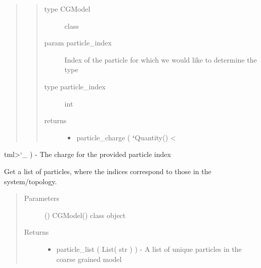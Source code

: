 \documentclass[letterpaper,12pt,english,openany,oneside]{sphinxmanual}
\begin{document}
\begin{fulllineitems}
\begin{fulllineitems}
\begin{quote}
\begin{quote}
\begin{description}
\item[{type CGModel}] \leavevmode
class

\item[{param particle\_index}] \leavevmode
Index of the particle for which we would like to determine the type

\item[{type particle\_index}] \leavevmode
int

\item[{returns}] \leavevmode\begin{itemize}
\item {} 
particle\_charge ( {\color{red}\bfseries{}{}`}Quantity() \textless{}

\end{itemize}

\end{description}\end{quote}
\end{quote}

tml\textgreater{}{}`\_ ) - The charge for the provided particle index

\end{fulllineitems}


\begin{fulllineitems}
\label{\detokenize{cg_model:cg_model.cgmodel.CGModel.get_particle_list}}
Get a list of particles, where the indices correspond to those in the system/topology.
\begin{quote}\begin{description}
\item[{Parameters}] \leavevmode
{} () \textendash{} CGModel() class object

\item[{Returns}] \leavevmode
\begin{itemize}
\item {} 
particle\_list ( List( str ) ) - A list of unique particles in the coarse grained model

\end{itemize}


\end{description}\end{quote}


\end{fulllineitems}
\end{fulllineitems}
\end{document}
